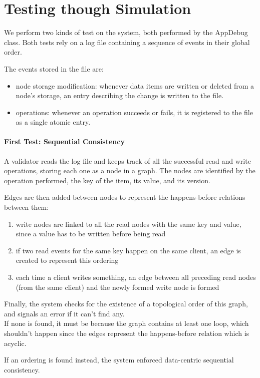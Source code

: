 \documentclass{article}
\begin{document}
\section{Testing though Simulation}
We perform two kinds of test on the system, both performed by the AppDebug class. 
Both tests rely on a log file containing a sequence of events in their global order.

The events stored in the file are:
\begin{itemize}
    \item node storage modification: whenever data items are written or deleted 
    from a node's storage, an entry describing the change is written to the file.
    \item operations: whenever an operation succeeds or fails, it is registered 
    to the file as a single atomic entry.
\end{itemize}

\paragraph {First Test: Sequential Consistency}
A validator reads the log file and keeps track of all the successful read and write
operations, storing each one as a node in a graph. The nodes are identified
by the operation performed, the key of the item, its value, and its version.

Edges are then added between nodes to represent the happens-before relations 
between them:
\begin{enumerate}
    \item write nodes are linked to all the read nodes with the same key and 
    value, since
        a value has to be written before being read
    \item if two read events for the same key happen on the same client, an edge 
    is created
        to represent this ordering
    \item each time a client writes something, an edge between all preceding 
    read nodes (from the same client) and the
        newly formed write node is formed
\end{enumerate}
Finally, the system checks for the existence of a topological order of this 
graph, and signals an error if it can't find any.\\
If none is found, it must be because the graph contains at least one loop, which 
shouldn't happen since the edges
represent the happens-before relation which is acyclic.

If an ordering is found instead, the system enforced data-centric sequential 
consistency.
\end{document}
